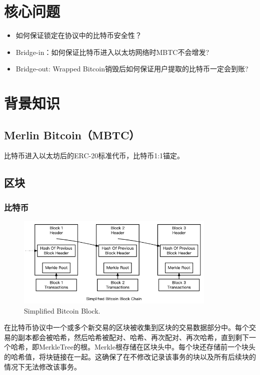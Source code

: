 \documentclass{article}
\begin{document}
\section{核心问题}
\begin{itemize}
    \item 如何保证锁定在协议中的比特币安全性？
    \item Bridge-in：如何保证比特币进入以太坊网络时MBTC不会增发?
    \item Bridge-out: Wrapped Bitcoin销毁后如何保证用户提取的比特币一定会到账?
\end{itemize}

\section{背景知识}
\subsection{Merlin Bitcoin（MBTC）}
\par 比特币进入以太坊后的ERC-20标准代币，比特币1:1锚定。
\subsection{区块}
\subsubsection{比特币}
\begin{figure}[h]
\centering
\includegraphics[width=0.85\textwidth]{bitcoin_block.png}
\caption{\label{fig:bitcoin_block}Simplified Bitcoin Block.}
\end{figure}
\par 在比特币协议中一个或多个新交易的区块被收集到区块的交易数据部分中\cite{nakamoto}。每个交易的副本都会被哈希，然后哈希被配对、哈希、再次配对、再次哈希，直到剩下一个哈希，即MerkleTree的根。Merkle根存储在区块头中。每个块还存储前一个块头的哈希值，将块链接在一起。这确保了在不修改记录该事务的块以及所有后续块的情况下无法修改该事务。
\end{document}
